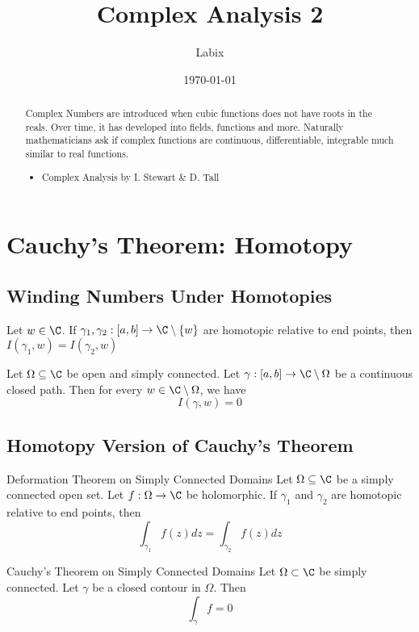 \documentclass[a4paper]{article}
\title{Complex Analysis 2}
\author{Labix}
\date{\today}
\begin{document}
\maketitle
\begin{abstract}
Complex Numbers are  introduced when cubic functions does not have roots in the reals. Over time, it has developed into fields, functions and more. Naturally mathematicians ask if complex functions are continuous, differentiable, integrable much similar to real functions. \\
\begin{itemize}
\item Complex Analysis by I. Stewart \& D. Tall
\end{itemize}
\end{abstract}
\tableofcontents
\pagebreak

\section{Cauchy's Theorem: Homotopy}
\subsection{Winding Numbers Under Homotopies}
\begin{thm}{}{} Let $w\in\C$. If $\gamma_1,\gamma_2:[a,b]\to\C\setminus\{w\}$ are homotopic relative to end points, then $I(\gamma_1,w)=I(\gamma_2,w)$
\end{thm}

\begin{crl}{}{} Let $\Omega\subseteq\C$ be open and simply connected. Let $\gamma:[a,b]\to\C\setminus\Omega$ be a continuous closed path. Then for every $w\in\C\setminus\Omega$, we have $$I(\gamma,w)=0$$
\end{crl}

\subsection{Homotopy Version of Cauchy's Theorem}
\begin{thm}{Deformation Theorem on Simply Connected Domains}{} Let $\Omega\subseteq\C$ be a simply connected open set. Let $f:\Omega\to\C$ be holomorphic. If $\gamma_1$ and $\gamma_2$ are homotopic relative to end points, then $$\int_{\gamma_1}f(z)dz=\int_{\gamma_2}f(z)dz$$
\end{thm}

\begin{thm}{Cauchy's Theorem on Simply Connected Domains}{} Let $\Omega\subset\C$ be simply connected. Let $\gamma$ be a closed contour in $\Omega$. Then $$\int_{\gamma}f=0$$
\end{thm}
\end{document}
